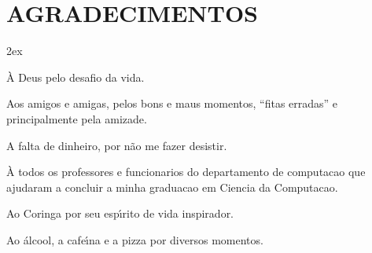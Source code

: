\chapter*{AGRADECIMENTOS}
\begin{trivlist}  \itemsep 2ex  \normalsize
	\item \`{A} Deus pelo desafio da vida.
        \item Aos amigos e amigas, pelos bons e maus momentos, ``fitas erradas'' e principalmente pela amizade.
        \item A falta de dinheiro, por n\~ao me fazer desistir.
	\item \`{A} todos os professores e funcionarios do departamento de computacao que ajudaram a concluir a minha graduacao em Ciencia da Computacao.
	\item Ao Coringa por seu esp\'{\i}rito de vida inspirador.
	\item Ao \'{a}lcool, a cafe\'{\i}na e a pizza por diversos momentos.
\end{trivlist}
